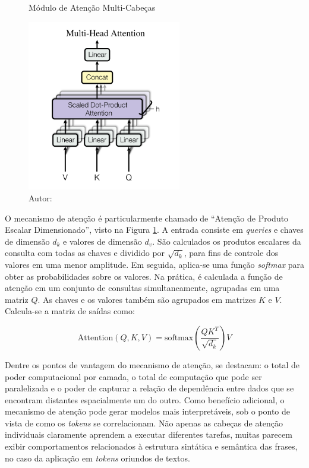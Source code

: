 \begin{figure}[htbp]
    \centering
    \caption{Módulo de Atenção Multi-Cabeças}
    \includegraphics[width=0.6\textwidth]{figures/fig005.png}
    \caption*{Autor:\cite{vaswaniAttentionAllYou2023}}
    \label{fig:fig005}
\end{figure}

O mecanismo de atenção é particularmente chamado de ``Atenção de Produto Escalar Dimensionado'', visto na Figura \ref{fig:fig005}. A entrada consiste em \textit{queries} e chaves de dimensão $d_{k}$ e valores de dimensão $d_{v}$. São calculados os produtos escalares da consulta com todas as chaves e dividido por $\sqrt{d_{k}}$, para fins de controle dos valores em uma menor amplitude. Em seguida, aplica-se uma função \textit{softmax} para obter as probabilidades sobre os valores. Na prática, é calculada a função de atenção em um conjunto de consultas simultaneamente, agrupadas em uma matriz $Q$. As chaves e os valores também são agrupados em matrizes $K$ e $V$. Calcula-se a matriz de saídas como:

\begin{equation}
\text{Attention}(Q, K, V) = \text{softmax}\left(\frac{QK^T}{\sqrt{d_k}}\right)V
\label{eq:attention}
\end{equation}

Dentre os pontos de vantagem do mecanismo de atenção, se destacam: o total de poder computacional por camada, o total de computação que pode ser paralelizada e o poder de capturar a relação de dependência entre dados que se encontram distantes espacialmente um do outro. Como benefício adicional, o mecanismo de atenção pode gerar modelos mais interpretáveis, sob o ponto de vista de como os \textit{tokens} se correlacionam. Não apenas as cabeças de atenção individuais claramente aprendem a executar diferentes tarefas, muitas parecem exibir comportamentos relacionados à estrutura sintática e semântica das frases, no caso da aplicação em \textit{tokens} oriundos de textos.

